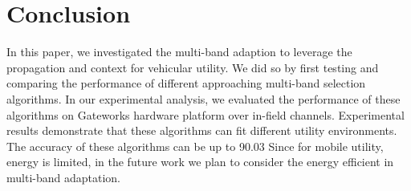 \section{Conclusion}
\label{sec:conclusion}
In this paper, we investigated the multi-band adaption to leverage the propagation and context for vehicular utility. 
We did so by first testing and comparing the performance of different approaching multi-band selection algorithms. 
In our experimental analysis, we evaluated the performance of these algorithms on Gateworks hardware platform over in-field channels. 
Experimental results demonstrate that these algorithms can fit different utility environments. The accuracy of these algorithms can be up to 90.03%
Since for mobile utility, energy is limited, in the future work we plan to consider the energy efficient in multi-band adaptation.
